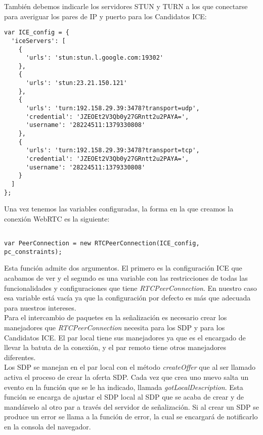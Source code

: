 También debemos indicarle los servidores STUN y TURN a los que conectarse para averiguar los pares de IP y puerto para los Candidatos ICE:\\

\begin{lstlisting}[caption=Servidores STUN y TURN]
var ICE_config = {
  'iceServers': [
    {
      'urls': 'stun:stun.l.google.com:19302'
    },
    {
      'urls': 'stun:23.21.150.121'
    },
    {
      'urls': 'turn:192.158.29.39:3478?transport=udp',
      'credential': 'JZEOEt2V3Qb0y27GRntt2u2PAYA=',
      'username': '28224511:1379330808'
    },
    {
      'urls': 'turn:192.158.29.39:3478?transport=tcp',
      'credential': 'JZEOEt2V3Qb0y27GRntt2u2PAYA=',
      'username': '28224511:1379330808'
    }
  ]
};
\end{lstlisting}

Una vez tenemos las variables configuradas, la forma en la que creamos la conexión WebRTC es la siguiente:\\

\begin{lstlisting}[caption=RTCPeerConnection.]

var PeerConnection = new RTCPeerConnection(ICE_config, pc_constraints);
\end{lstlisting}

Esta función admite dos argumentos. El primero es la configuración ICE que acabamos de ver y el segundo es una variable con las restricciones de todas las funcionalidades y configuraciones que tiene \emph{RTCPeerConnection}. En nuestro caso esa variable está vacía ya que la configuración por defecto es más que adecuada para nuestros intereses.\\

Para el intercambio de paquetes en la señalización es necesario crear los manejadores que \emph{RTCPeerConnection} necesita para los SDP y para los Candidatos ICE. El par local tiene sus manejadores ya que es el encargado de llevar la batuta de la conexión, y el par remoto tiene otros manejadores diferentes. \\

Los SDP se manejan en el par local con el método \emph{createOffer} que al ser llamado activa el proceso de crear la oferta SDP. Cada vez que crea uno nuevo salta un evento en la función que se le ha indicado, llamada \emph{gotLocalDescription}. Esta función se encarga de ajustar el SDP local al SDP que se acaba de crear y de mandárselo al otro par a través del servidor de señalización. Si al crear un SDP se produce un error se llama a la función de error, la cual se encargará de notificarlo en la consola del navegador.\\


